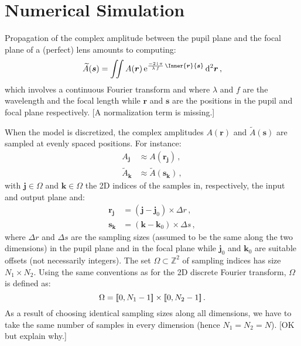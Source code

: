 \documentclass[a4paper,10pt,twocolumn]{scrartcl}
\title{\Title}
\author{\Authors}
\newcommand{\oops}[1]{\textcolor[named]{BrickRed}{#1}}
\newcommand*{\mathd}{\mathrm{d}}
\newcommand*{\mathe}{\mathrm{e}}
\newcommand*{\mathi}{\mathrm{i}}
\newcommand*{\Set}[1]{\mathbb{#1}}
\newcommand*{\Integers}{\Set{Z}}
\newcommand*{\FT}[1]{\widetilde{#1}}
\newcommand*{\V}[1]{\boldsymbol{#1}}   %
\newcommand*{\IntegerRange}[1]{[\hspace*{-0.4ex}[#1]\hspace*{-0.4ex}]}
\begin{document}
\maketitle

\begin{abstract}
Abstract...
\end{abstract}


\section{Numerical Simulation}

Propagation of the complex amplitude between the pupil plane and the focal
plane of a (perfect) lens amounts to computing:
\begin{align}
  \FT{A}(\V s) = \iint A(\V r) \, \mathe^{
    \frac{-2\,\mathi\,\pi}{\lambda\,f}\,\Inner{\V r}{\V s}
  } \, \mathd^2\V r \, ,
  \label{eq:lens-transform}
\end{align}
which involves a continuous Fourier transform and where $\lambda$ and $f$
are the wavelength and the focal length while $\V r$ and $\V s$ are the
positions in the pupil and focal plane respectively.  \oops{[A
normalization term is missing.]}

When the model is discretized, the complex amplitudes $A(\V r)$ and
$\FT{A}(\V s)$ are sampled at evenly spaced positions.  For instance:
\begin{subequations}
\begin{align}
  A_{\V j} &\approx A(\V r_{\V j}) \,, \\
  \FT{A}_{\V k} &\approx \FT{A}(\V s_{\V k}) \,,
\end{align}
\end{subequations}
with $\V j \in \Omega$ and $\V k \in \Omega$ the 2D indices of the
samples in, respectively, the input and output plane and:
\begin{subequations}
\begin{align}
  \V r_{\V j} &= (\V j - \V j_0) \times \Delta r \, , \\
  \V s_{\V k} &= (\V k - \V k_0) \times \Delta s \, ,
\end{align}
\end{subequations}
where $\Delta r$ and $\Delta s$ are the sampling sizes (assumed to be the
same along the two dimensions) in the pupil plane and in the focal plane
while $\V j_0$ and $\V k_0$ are suitable offsets (not necessarily
integers).  The set $\Omega \subset \Integers^2$ of sampling indices has
size $N_1 \times N_2$.  Using the same conventions as for the 2D discrete
Fourier transform, $\Omega$ is defined as:
\begin{equation}
  \Omega = \IntegerRange{0,N_1-1}\times\IntegerRange{0,N_2-1} \, .
\end{equation}
As a result of choosing identical sampling sizes along all dimensions, we
have to take the same number of samples in every dimension (hence
$N_1=N_2=N$). \oops{[OK but explain why.]}
\end{document}
